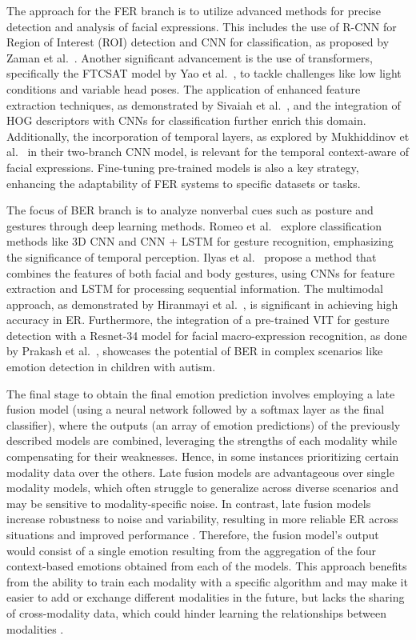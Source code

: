 \documentclass[runningheads]{llncs}
\begin{document}
The approach for the FER branch is to utilize advanced methods for precise detection and analysis of facial expressions. This includes the use of R-CNN for Region of Interest (ROI) detection and CNN for classification, as proposed by Zaman et al.~\cite{Zaman2022}. Another significant advancement is the use of transformers, specifically the FTCSAT model by Yao et al.~\cite{Yao2023}, to tackle challenges like low light conditions and variable head poses. The application of enhanced feature extraction techniques, as demonstrated by Sivaiah et al.~\cite{Bellamkonda2020}, and the integration of HOG descriptors with CNNs for classification further enrich this domain. Additionally, the incorporation of temporal layers, as explored by Mukhiddinov et al.~\cite{Mukhiddinov2023} in their two-branch CNN model, is relevant for the temporal context-aware of facial expressions. Fine-tuning pre-trained models is also a key strategy, enhancing the adaptability of FER systems to specific datasets or tasks.

The focus of BER branch is to analyze nonverbal cues such as posture and gestures through deep learning methods. Romeo et al.~\cite{Romeo2021} explore classification methods like 3D CNN and CNN + LSTM for gesture recognition, emphasizing the significance of temporal perception. Ilyas et al.~\cite{Ilyas2021} propose a method that combines the features of both facial and body gestures, using CNNs for feature extraction and LSTM for processing sequential information. The multimodal approach, as demonstrated by Hiranmayi et al.~\cite{Ranganathan2016}, is significant in achieving high accuracy in ER. Furthermore, the integration of a pre-trained VIT for gesture detection with a Resnet-34 model for facial macro-expression recognition, as done by Prakash et al.~\cite{Prakash2023}, showcases the potential of BER in complex scenarios like emotion detection in children with autism.

The final stage to obtain the final emotion prediction involves employing a late fusion model (using a neural network followed by a softmax layer as the final classifier), where the outputs (an array of emotion predictions) of the previously described models are combined, leveraging the strengths of each modality while compensating for their weaknesses. Hence, in some instances prioritizing certain modality data over the others. Late fusion models are advantageous over single modality models, which often struggle to generalize across diverse scenarios and may be sensitive to modality-specific noise. In contrast, late fusion models increase robustness to noise and variability, resulting in more reliable ER across situations and improved performance \cite{zhu_multimodal_2023, sleeman_multimodal_2022}. Therefore, the fusion model's output would consist of a single emotion resulting from the aggregation of the four context-based emotions obtained from each of the models. This approach benefits from the ability to train each modality with a specific algorithm and may make it easier to add or exchange different modalities in the future, but lacks the sharing of cross-modality data, which could hinder learning the relationships between modalities \cite{sleeman_multimodal_2022}.
\end{document}
